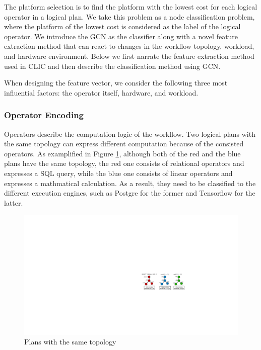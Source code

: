 The platform selection is to find the platform with the lowest cost for each logical operator in a logical plan. 
We take this problem as a node classification problem, where the platform of the lowest cost is considered as the label of the logical operator. 
We introduce the GCN as the classifier along with a novel feature extraction method that can react to changes in the workflow topology, workload, and hardware environment.
Below we first narrate the feature extraction method used in CLIC and then describe the classification method using GCN.

When designing the feature vector, we consider the following three most influential factors: the operator itself, hardware, and workload.

\subsubsection{Operator Encoding}
Operators describe the computation logic of the workflow.
Two logical plans with the same topology can express different computation because of the consisted operators.
As examplified in Figure \ref{fig:graph-comparison}, although both of the red and the blue plans have the same topology,
the red one consists of relational operators and expresses a SQL query, while the blue one consists of linear operators and expresses a mathmatical calculation.
As a result, they need to be classified to the different execution engines, such as Postgre for the former and Tensorflow for the latter.

\begin{figure}
  \centering
  \includegraphics[width=0.7\linewidth]{figures/graph-comparison.pdf}
  \caption{Plans with the same topology}
  \label{fig:graph-comparison}
\end{figure}

